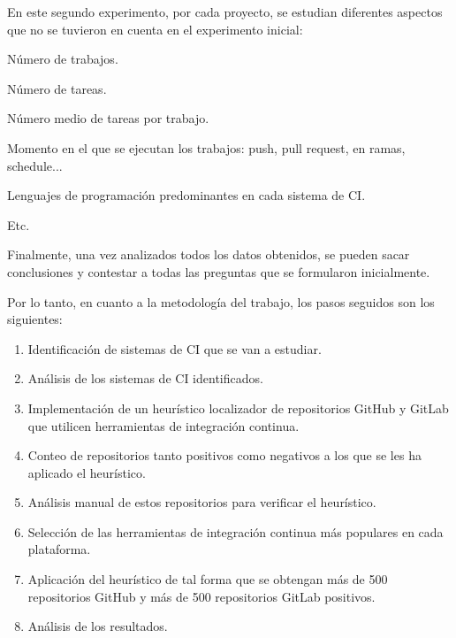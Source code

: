 En este segundo experimento, por cada proyecto, se estudian diferentes aspectos que no se tuvieron en cuenta en el experimento inicial:
\begin{compactitem}
    \item Número de trabajos.
    \item Número de tareas.
    \item Número medio de tareas por trabajo.
    \item Momento en el que se ejecutan los trabajos: push, pull request, en ramas, schedule...
    \item Lenguajes de programación predominantes en cada sistema de CI.
    \item Etc.
\end{compactitem}

Finalmente, una vez analizados todos los datos obtenidos, se pueden sacar conclusiones y contestar a todas las preguntas que se formularon inicialmente.
	
Por lo tanto, en cuanto a la metodología del trabajo, los pasos seguidos son los siguientes:
\begin{enumerate}
    \item Identificación de sistemas de CI que se van a estudiar.
    \item Análisis de los sistemas de CI identificados.
    \item Implementación de un heurístico localizador de repositorios GitHub y GitLab que utilicen herramientas de integración continua.
    \item Conteo de repositorios tanto positivos como negativos a los que se les ha aplicado el heurístico.
    \item Análisis manual de estos repositorios para verificar el heurístico.
    \item Selección de las herramientas de integración continua más populares en cada plataforma.
    \item Aplicación del heurístico de tal forma que se obtengan más de 500 repositorios GitHub y más de 500 repositorios GitLab positivos.
    \item Análisis de los resultados.
\end{enumerate}

